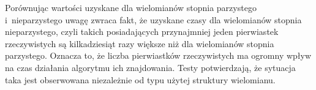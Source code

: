 Porównując wartości uzyskane dla wielomianów stopnia parzystego i~nieparzystego uwagę zwraca fakt, że uzyskane czasy dla wielomianów stopnia nieparzystego, czyli takich posiadających przynajmniej jeden pierwiastek rzeczywistych są kilkadziesiąt razy większe niż dla wielomianów stopnia parzystego. Oznacza to, że liczba pierwiastków rzeczywistych ma ogromny wpływ na czas działania algorytmu ich znajdowania. Testy potwierdzają, że sytuacja taka jest obserwowana niezależnie od typu użytej struktury wielomianu.
